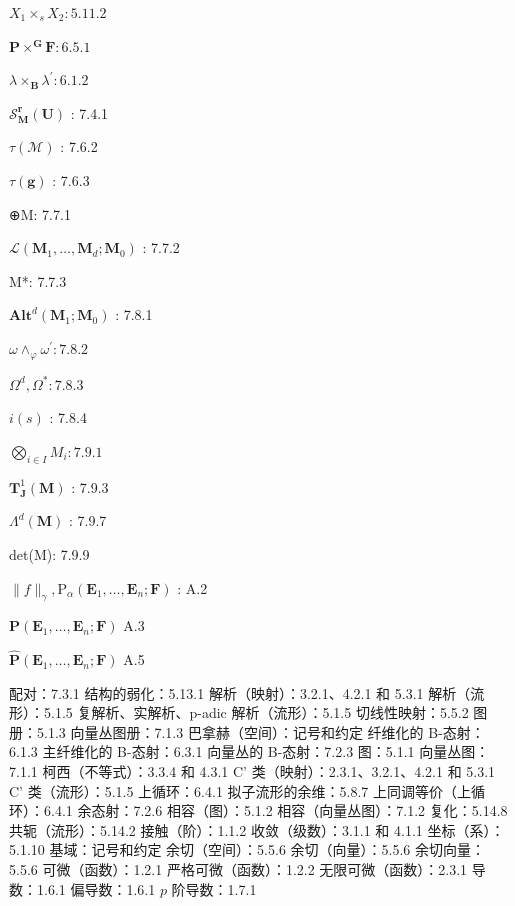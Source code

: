 \(X_{1} \times_{s} X_{2}: 5.11.2\)

\(\mathbf{P} \times^{\mathbf{G}} \mathbf{F}: 6.5.1\)

\(\lambda \times_{\mathbf{B}}\lambda^{\prime}:6.1.2\)

\(\mathcal{S}_{\mathbf{M}}^{\boldsymbol{r}}(\mathbf{U})\) : 7.4.1

\(\tau (\mathcal{M})\) : 7.6.2

\(\tau (\mathbf{g})\) : 7.6.3

⊕M: 7.7.1

\(\mathcal{L}(\mathbf{M}_1,\dots ,\mathbf{M}_d;\mathbf{M}_0)\) : 7.7.2

M*: 7.7.3

\(\mathbf{Alt}^d (\mathbf{M}_1;\mathbf{M}_0)\) : 7.8.1

\(\omega \wedge_{\varphi}\omega^{\prime}:7.8.2\)

\(\Omega^d,\Omega^* :7.8.3\)

\(i(s)\) : 7.8.4

\(\bigotimes_{i \in I} M_i: 7.9.1\)

\(\mathbf{T}_{\mathbf{J}}^{1}(\mathbf{M})\) : 7.9.3

\(\Lambda^{d}(\mathbf{M})\) : 7.9.7

det(M): 7.9.9

\(\| f\|_{\gamma},\mathrm{P}_{\alpha}(\mathbf{E}_1,\dots ,\mathbf{E}_n;\mathbf{F})\) : A.2

\(\mathbf{P}(\mathbf{E}_1,\dots ,\mathbf{E}_n;\mathbf{F})\) A.3

\(\hat{\mathbf{P}} (\mathbf{E}_1,\dots ,\mathbf{E}_n;\mathbf{F})\) A.5


配对：7.3.1 结构的弱化：5.13.1 解析（映射）：3.2.1、4.2.1 和 5.3.1 解析（流形）：5.1.5 复解析、实解析、p-adic 解析（流形）：5.1.5 切线性映射：5.5.2 图册：5.1.3 向量丛图册：7.1.3 巴拿赫（空间）：记号和约定 纤维化的 B-态射：6.1.3 主纤维化的 B-态射：6.3.1 向量丛的 B-态射：7.2.3 图：5.1.1 向量丛图：7.1.1 柯西（不等式）：3.3.4 和 4.3.1 C' 类（映射）：2.3.1、3.2.1、4.2.1 和 5.3.1 C' 类（流形）：5.1.5 上循环：6.4.1 拟子流形的余维：5.8.7 上同调等价（上循环）：6.4.1 余态射：7.2.6 相容（图）：5.1.2 相容（向量丛图）：7.1.2 复化：5.14.8 共轭（流形）：5.14.2 接触（阶）：1.1.2 收敛（级数）：3.1.1 和 4.1.1 坐标（系）：5.1.10 基域：记号和约定 余切（空间）：5.5.6 余切（向量）：5.5.6 余切向量：5.5.6 可微（函数）：1.2.1 严格可微（函数）：1.2.2 无限可微（函数）：2.3.1 导数：1.6.1 偏导数：1.6.1 \(p\) 阶导数：1.7.1

